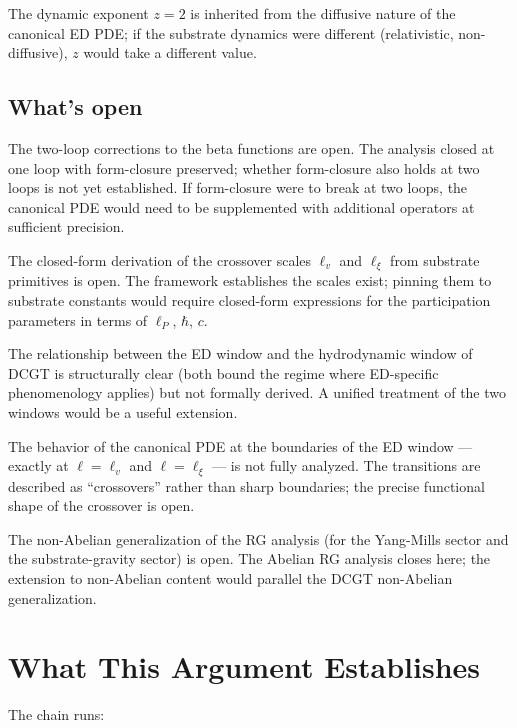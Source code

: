 \documentclass[11pt,a4paper]{article}
\begin{document}
The dynamic exponent $z = 2$ is inherited from the diffusive nature of the canonical ED PDE; if the substrate dynamics were different (relativistic, non-diffusive), $z$ would take a different value.

\subsection{What's open}

The two-loop corrections to the beta functions are open. The analysis closed at one loop with form-closure preserved; whether form-closure also holds at two loops is not yet established. If form-closure were to break at two loops, the canonical PDE would need to be supplemented with additional operators at sufficient precision.

The closed-form derivation of the crossover scales $\ell_v$ and $\ell_\xi$ from substrate primitives is open. The framework establishes the scales exist; pinning them to substrate constants would require closed-form expressions for the participation parameters in terms of $\ell_P$, $\hbar$, $c$.

The relationship between the ED window and the hydrodynamic window of DCGT is structurally clear (both bound the regime where ED-specific phenomenology applies) but not formally derived. A unified treatment of the two windows would be a useful extension.

The behavior of the canonical PDE at the boundaries of the ED window --- exactly at $\ell = \ell_v$ and $\ell = \ell_\xi$ --- is not fully analyzed. The transitions are described as ``crossovers'' rather than sharp boundaries; the precise functional shape of the crossover is open.

The non-Abelian generalization of the RG analysis (for the Yang-Mills sector and the substrate-gravity sector) is open. The Abelian RG analysis closes here; the extension to non-Abelian content would parallel the DCGT non-Abelian generalization.

\section{What This Argument Establishes}

The chain runs:
\end{document}
